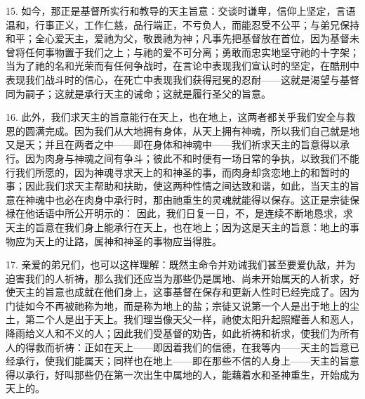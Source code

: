 15. 如今，那正是基督所实行和教导的天主旨意：交谈时谦卑，信仰上坚定，言语温和，行事正义，工作仁慈，品行端正，不亏负人，而能忍受不公平；与弟兄保持和平；全心爱天主，爱祂为父，敬畏祂为神；凡事先把基督放在首位，因为基督未曾将任何事物置于我们之上；与祂的爱不可分离；勇敢而忠实地坚守祂的十字架；当为了祂的名和光荣而有任何争战时，在言论中表现我们宣认时的坚定，在酷刑中表现我们战斗时的信心，在死亡中表现我们获得冠冕的忍耐——这就是渴望与基督同为嗣子；这就是承行天主的诫命；这就是履行圣父的旨意。\par

16. 此外，我们求天主的旨意能行在天上，也在地上，这两者都关乎我们安全与救恩的圆满完成。因为我们从大地拥有身体，从天上拥有神魂，所以我们自己就是地又是天；并且在两者之中——即在身体和神魂中——我们祈求天主的旨意得以承行。因为肉身与神魂之间有争斗；彼此不和时便有一场日常的争执，以致我们不能行我们所愿的，因为神魂寻求天上的和神圣的事，而肉身却贪恋地上的和暂时的事；因此我们求天主帮助和扶助，使这两种性情之间达致和谐，如此，当天主的旨意在神魂中也必在肉身中承行时，那由祂重生的灵魂就能得以保存。这正是宗徒保禄在他话语中所公开明示的：  因此，我们日复一日，不，是连续不断地恳求，求天主的旨意在我们身上能承行在天上，也在地上；因为这是天主的旨意：地上的事物应为天上的让路，属神和神圣的事物应当得胜。\par

17. 亲爱的弟兄们，也可以这样理解：既然主命令并劝诫我们甚至要爱仇敌，并为迫害我们的人祈祷，那么我们还应当为那些仍是属地、尚未开始属天的人祈求，好使天主的旨意也成就在他们身上，这事基督在保存和更新人性时已经完成了。因为门徒如今不再被祂称为地，而是称为地上的盐；宗徒又说第一个人是出于地上的尘土，第二个人是出于天上。我们理当像天父一样，祂使太阳升起照耀善人和恶人，降雨给义人和不义的人；因此我们受基督的劝告，如此祈祷和祈求，使我们为所有人的得救而祈祷：正如在天上——即因着我们的信德，在我等内——天主的旨意已经承行，使我们能属天；同样也在地上——即在那些不信的人身上——天主的旨意得以承行，好叫那些仍在第一次出生中属地的人，能藉着水和圣神重生，开始成为天上的。\par

